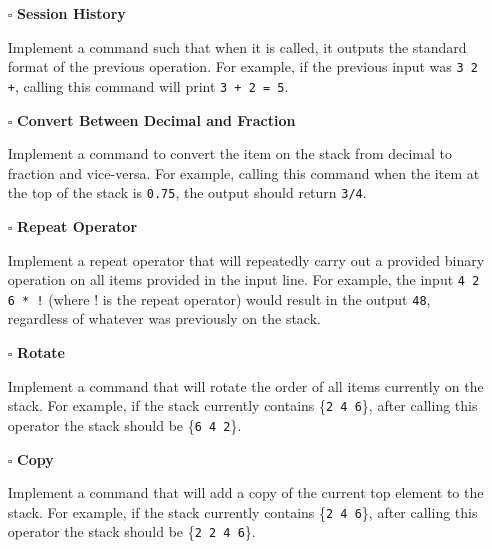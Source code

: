 \documentclass{article}
\begin{document}
\begin{itemize}
  \item[$\square$] \textbf{Session History}
  
Implement a command such that when it is called, it outputs the standard format of the previous operation. For example, if the previous input was \texttt{3 2 +}, calling this command will print \texttt{3 + 2 = 5}.\newline
\end{itemize}

\begin{itemize}
  \item[$\square$] \textbf{Convert Between Decimal and Fraction}
  
Implement a command to convert the item on the stack from decimal to fraction and vice-versa. For example, calling this command when the item at the top of the stack is \texttt{0.75}, the output should return \texttt{3/4}.\newline
\end{itemize}

\begin{itemize}
  \item[$\square$] \textbf{Repeat Operator}
  
Implement a repeat operator that will repeatedly carry out a provided binary operation on all items provided in the input line. For example, the input \texttt{4 2 6 * !} (where ! is the repeat operator) would result in the output \texttt{48}, regardless of whatever was previously on the stack.\newline
\end{itemize}

\begin{itemize}
  \item[$\square$] \textbf{Rotate}
  
Implement a command that will rotate the order of all items currently on the stack. For example, if the stack currently contains \{\texttt{2 4 6}\}, after calling this operator the stack should be \{\texttt{6 4 2}\}.\newline
\end{itemize}

\begin{itemize}
  \item[$\square$] \textbf{Copy}
  
Implement a command that will add a copy of the current top element to the stack. For example, if the stack currently contains \{\texttt{2 4 6}\}, after calling this operator the stack should be \{\texttt{2 2 4 6}\}.\newline
\end{itemize}
\end{document}
